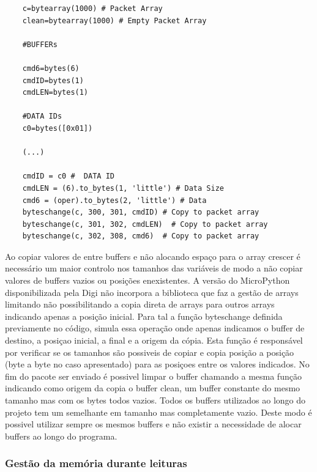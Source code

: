 	
\begin{verbatim}
	c=bytearray(1000) # Packet Array
	clean=bytearray(1000) # Empty Packet Array 

	#BUFFERs

	cmd6=bytes(6)
	cmdID=bytes(1)
	cmdLEN=bytes(1)

	#DATA IDs
	c0=bytes([0x01])
	
	(...)	

	cmdID = c0 #  DATA ID
	cmdLEN = (6).to_bytes(1, 'little') # Data Size
	cmd6 = (oper).to_bytes(2, 'little') # Data
	byteschange(c, 300, 301, cmdID) # Copy to packet array 
	byteschange(c, 301, 302, cmdLEN)  # Copy to packet array 
	byteschange(c, 302, 308, cmd6)  # Copy to packet array 
 \end{verbatim}

\par Ao copiar valores de entre buffers e não alocando espaço para o array crescer é necessário um maior controlo nos tamanhos das variáveis de modo a não copiar valores de buffers vazios ou posições enexistentes. A versão do MicroPython disponibilizada pela Digi não incorpora a biblioteca que faz a gestão de arrays limitando não possibilitando a copia direta de arrays para outros arrays indicando apenas a posição inicial. Para tal a função byteschange definida previamente no código, simula essa operação onde apenas indicamos o buffer de destino, a posiçao inicial, a final e a origem da cópia. Esta função é responsável por verificar se os tamanhos são possiveis de copiar e copia posição a posição (byte a byte no caso apresentado) para as posiçoes entre os valores indicados. No fim do pacote ser enviado é possivel limpar o buffer chamando a mesma função indicando como origem da copia o buffer clean, um buffer constante do mesmo tamanho mas com os bytes todos vazios. Todos os buffers utilizados ao longo do projeto tem um semelhante em tamanho mas completamente vazio. Deste modo é possivel utilizar sempre os mesmos buffers e não existir a necessidade de alocar buffers ao longo do programa.

\subsubsection {Gestão da memória durante leituras}


